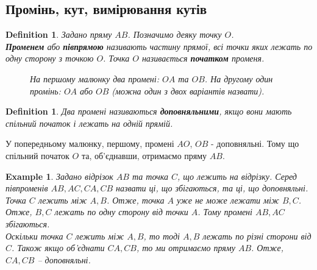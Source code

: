 \documentclass[a4paper, 10pt]{article}
\theoremstyle{theoremdd}
\theoremstyle{theoremdd}
\theoremstyle{theoremdd}
\newtheorem{definition}[theorem]{Definition}
\theoremstyle{theoremdd}
\theoremstyle{theoremdd}
\newtheorem{example}[theorem]{Example}
\theoremstyle{theoremdd}
\theoremstyle{theoremdd}
\theoremstyle{theoremdd}
\theoremstyle{theoremdd}
\begin{document}
\subsection{Промінь, кут, вимірювання кутів}
\begin{definition}
Задано пряму $AB$. Позначимо деяку точку $O$.\\
\textbf{Променем} або \textbf{півпрямою} називають частину прямої, всі точки яких лежать по одну сторону з точкою $O$. Точка $O$ називається \textbf{початком} променя.
\begin{figure}[H]
\centering
{}
\qquad
{}
\caption*{На першому малюнку два промені: $OA$ та $OB$. На другому один промінь: $OA$ або $OB$ (можна один з двох варіантів назвати).}
\end{figure}
\end{definition}

\begin{definition}
Два промені називаються \textbf{доповняльними}, якщо вони мають спільний початок і лежать на одній прямій.
\end{definition}
У попередньому малюнку, першому, промені $AO$, $OB$ - доповняльні. Тому що спільний початок $O$ та, об'єднавши, отримаємо пряму $AB$.

\begin{example}
Задано відрізок $AB$ та точка $C$, що лежить на відрізку. Серед півпроменів $AB,AC,CA,CB$ назвати ці, що збігаються, та ці, що доповняльні.\\
Точка $C$ лежить між $A,B$. Отже, точка $A$ уже не може лежати між $B,C$. Отже, $B,C$ лежать по одну сторону від точки $A$. Тому промені $AB,AC$ збігаються.\\
Оскільки точка $C$ лежить між $A,B$, то тоді $A,B$ лежать по різні сторони від $C$. Також якщо об'єднати $CA,CB$, то ми отримаємо пряму $AB$. Отже, $CA,CB$ -- доповняльні.
\end{example}
\end{document}

